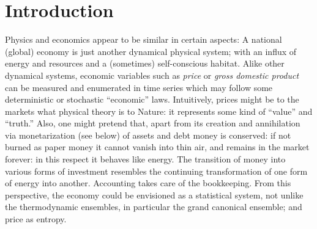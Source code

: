 \documentclass[aps,rmp,preprint,amsfonts,showpacs,showkeys]{revtex4}
\begin{document}
\section{Introduction}

Physics and economics appear to be similar in certain aspects:
A national (global) economy is just another dynamical physical system; with an influx of energy and resources and a (sometimes) self-conscious habitat.
Alike other dynamical systems, economic variables  such as {\em price} or {\em gross domestic product} can be measured and enumerated in time series
which may follow some deterministic \cite{frank} or stochastic ``economic'' laws.
Intuitively, prices might be to the markets what physical theory is to Nature:
it represents some kind of ``value'' and ``truth.''
Also, one might pretend that, apart from its creation and annihilation via monetarization (see below) of assets and debt \cite{Wicksell-geld,Wicksell-1907,schneider-VWLIII}
money is conserved: if not burned as paper money it cannot vanish into thin air, and remains in the market forever:
in this respect it behaves like energy.
The transition of money into various forms of investment resembles the continuing transformation of one form of energy into another.
Accounting takes care of the bookkeeping.
From this perspective, the economy could be envisioned as a statistical system, not unlike the thermodynamic ensembles,
in particular the grand canonical ensemble; and price as entropy.
\end{document}
